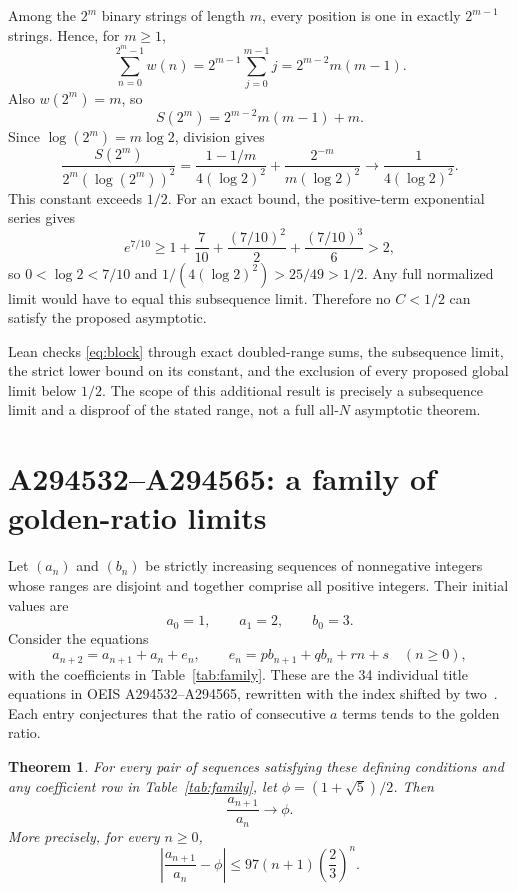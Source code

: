 \documentclass[11pt]{article}
\newtheorem{theorem}{Theorem}[section]
\begin{document}
Among the $2^m$ binary strings of length $m$, every position is one in
exactly $2^{m-1}$ strings. Hence, for $m\ge1$,
\[
 \sum_{n=0}^{2^m-1} w(n)
 =2^{m-1}\sum_{j=0}^{m-1}j
 =2^{m-2}m(m-1).
\]
Also $w(2^m)=m$, so
\begin{equation}
 S(2^m)=2^{m-2}m(m-1)+m.
 \label{eq:block}
\end{equation}
Since $\log(2^m)=m\log2$, division gives
\[
 \frac{S(2^m)}{2^m(\log(2^m))^2}
 =\frac{1-1/m}{4(\log2)^2}
   +\frac{2^{-m}}{m(\log2)^2}
 \longrightarrow\frac{1}{4(\log2)^2}.
\]
This constant exceeds $1/2$. For an exact bound, the positive-term
exponential series gives
\[
 e^{7/10}\ge 1+\frac7{10}+\frac{(7/10)^2}{2}
              +\frac{(7/10)^3}{6}>2,
\]
so $0<\log2<7/10$ and $1/(4(\log2)^2)>25/49>1/2$.
Any full normalized limit would have to equal this subsequence limit.
Therefore no $C<1/2$ can satisfy the proposed asymptotic.

Lean checks \eqref{eq:block} through exact doubled-range sums, the
subsequence limit, the strict lower bound on its constant, and the
exclusion of every proposed global limit below $1/2$. The scope of this
additional result is precisely a subsequence limit and a disproof of the
stated range, not a full all-$N$ asymptotic theorem.

\section{A294532--A294565: a family of golden-ratio limits}

Let $(a_n)$ and $(b_n)$ be strictly increasing sequences of nonnegative
integers whose ranges are disjoint and together comprise all positive
integers. Their initial values are
\[
 a_0=1,\qquad a_1=2,\qquad b_0=3.
\]
Consider the equations
\begin{equation}
 a_{n+2}=a_{n+1}+a_n+e_n,\qquad
 e_n=p b_{n+1}+q b_n+r n+s\quad(n\ge0),
 \label{eq:family}
\end{equation}
with the coefficients in Table~\ref{tab:family}. These are the 34
individual title equations in OEIS A294532--A294565, rewritten with the
index shifted by two~\cite{A294532}. Each entry conjectures that the ratio
of consecutive $a$ terms tends to the golden ratio.

\begin{theorem}\label{thm:family}
For every pair of sequences satisfying these defining conditions and any
coefficient row in Table~\ref{tab:family}, let $\phi=(1+\sqrt5)/2$. Then
\begin{equation}
 \boxed{\displaystyle \frac{a_{n+1}}{a_n}\longrightarrow\phi.}
 \label{eq:ratio}
\end{equation}
More precisely, for every $n\ge0$,
\begin{equation}
 \left|\frac{a_{n+1}}{a_n}-\phi\right|
 \le97(n+1)\left(\frac23\right)^n.
 \label{eq:error}
\end{equation}
\end{theorem}
\end{document}
